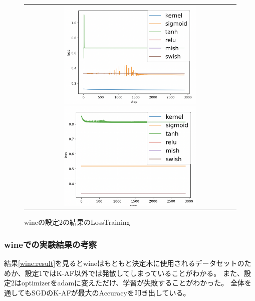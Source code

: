 \begin{figure}[hbtp]
    \begin{center}
        \begin{tabular}{c}
            \begin{minipage}{0.5\hsize}
                \includegraphics[clip, width=7cm]{asset/wine_0.001_3000_3_015_sgd_non_kaiming_uniform.png}
                    \caption{wineの設定1の結果のLossTraining}
                    \label{wine_1}
            \end{minipage}
            \hspace{10pt}
            \begin{minipage}{0.5\hsize}
                \includegraphics[clip, width=7cm]{asset/wine_0.001_3000_3_015_adam_non_kaiming_uniform}
                    \caption{wineの設定2の結果のLossTraining}
                    \label{wine_2}
            \end{minipage}
        \end{tabular}
    \end{center}
\end{figure}


\subsubsection{wineでの実験結果の考察}
結果\ref{wine:result}を見るとwineはもともと決定木に使用されるデータセットのためか、設定1ではK-AF以外では発散してしまっていることがわかる。
また、設定2はoptimizerをadamに変えただけ、学習が失敗することがわかった。
全体を通してもSGDのK-AFが最大のAccuracyを叩き出している。







